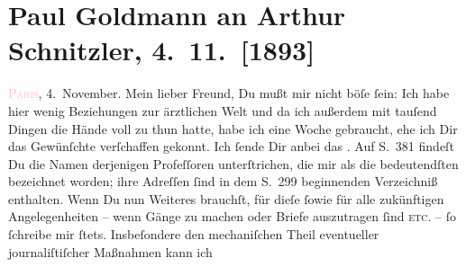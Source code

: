 

               \section[Paul Goldmann an Arthur Schnitzler, 4. 11. {[}1893{]}]{ Paul Goldmann an Arthur Schnitzler, 4. 11. {[}1893{]}}\nopagebreak{}\rehead{ }\normalsize\beginnumbering{} \toendnotes[C]{\smallbreak\pagebreak[2]} 
\toendnotes[C]{\smallbreak}\pstart
           \raggedleft{}{\pb}\textsc{\textcolor{pink}{Paris}{}\ledrightnote{\textcolor{pink}{Paris}}}, 4. November.\pend
           \pstart\center{}Mein lieber Freund,\pend\pstart
           Du mußt mir nicht böſe ſein: Ich habe hier wenig Beziehungen zur ärztlichen Welt und
               da ich außerdem mit tauſend Dingen die Hände voll zu thun hatte, habe ich eine Woche
               gebraucht, ehe ich Dir das Gewünſchte verſchaffen gekonnt. Ich ſende Dir anbei das
                  \label{K_L02719-1v}\label{K_L02719-1h}. Auf
               S. 381 findeſt Du die Namen derjenigen Profeſſoren unterſtrichen, die mir als die
               bedeutendſten bezeichnet worden; ihre Adreſſen ſind in dem S. 299 beginnenden {\pb}Verzeichniß enthalten. Wenn Du nun Weiteres brauchſt,
               für dieſe ſowie für alle zukünftigen Angelegenheiten – wenn Gänge zu machen oder
               Briefe auszutragen ſind \textsc{etc.} – ſo ſchreibe mir ſtets.
               Insbeſondere den mechaniſchen Theil eventueller journaliſtiſcher Maßnahmen kann ich
